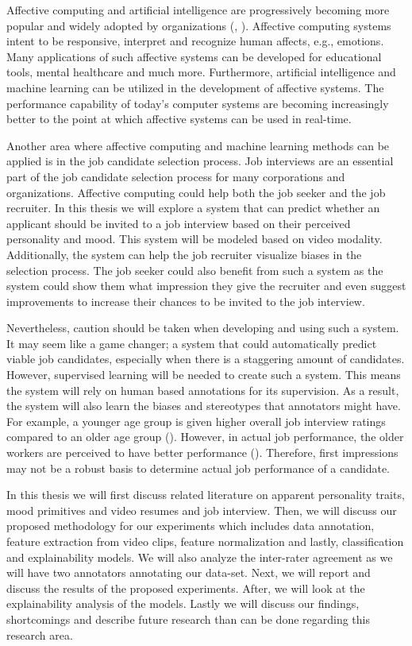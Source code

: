 Affective computing and artificial intelligence are progressively becoming more popular and widely adopted by organizations (\cite{davenport2018artificial}, \cite{tao2005affective}). Affective computing systems intent to be responsive, interpret and recognize human affects, e.g., emotions. Many applications of such affective systems can be developed for educational tools, mental healthcare and much more. Furthermore, artificial intelligence and machine learning can be utilized in the development of affective systems. The performance capability of today's computer systems are becoming increasingly better to the point at which affective systems can be used in real-time. 

Another area where affective computing and machine learning methods can be applied is in the job candidate selection process. Job interviews are an essential part of the job candidate selection process for many corporations and organizations. Affective computing could help both the job seeker and the job recruiter. In this thesis we will explore a system that can predict whether an applicant should be invited to a job interview based on their perceived personality and mood. This system will be modeled based on video modality. Additionally, the system can help the job recruiter visualize biases in the selection process. The job seeker could also benefit from such a system as the system could show them what impression they give the recruiter and even suggest improvements to increase their chances to be invited to the job interview. 

Nevertheless, caution should be taken when developing and using such a system. It may seem like a game changer; a system that could automatically predict viable job candidates, especially when there is a staggering amount of candidates. However, supervised learning will be needed to create such a system. This means the system will rely on human based annotations for its supervision. As a result, the system will also learn the biases and stereotypes that annotators might have. For example, a younger age group is given higher overall job interview ratings compared to an older age group (\cite{morgeson2008review}). However, in actual job performance, the older workers are perceived to have better performance (\cite{truxillo2012perceptions}). Therefore, first impressions may not be a robust basis to determine actual job performance of a candidate.

In this thesis we will first discuss related literature on apparent personality traits, mood primitives and video resumes and job interview. Then, we will discuss our proposed methodology for our experiments which includes data annotation, feature extraction from video clips, feature normalization and lastly, classification and explainability models. We will also analyze the inter-rater agreement as we will have two annotators annotating our data-set. Next, we will report and discuss the results of the proposed experiments. After, we will look at the explainability analysis of the models. Lastly we will discuss our findings, shortcomings and describe future research than can be done regarding this research area. 
